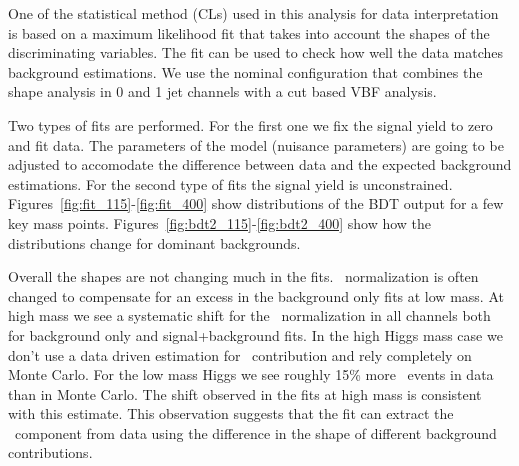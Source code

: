 One of the statistical method (CLs) used in this analysis for data
interpretation is based on a maximum likelihood fit that takes into
account the shapes of the discriminating variables. The fit can be
used to check how well the data matches background estimations. We use
the nominal configuration that combines the shape analysis in 0 and 1
jet channels with a cut based VBF analysis.

Two types of fits are performed. For the first one we fix the signal
yield to zero and fit data. The parameters of the model (nuisance
parameters) are going to be adjusted to accomodate the difference
between data and the expected background estimations. For the second
type of fits the signal yield is
unconstrained. Figures~\ref{fig:fit_115}-\ref{fig:fit_400} show
distributions of the BDT output for a few key mass
points. Figures~\ref{fig:bdt2_115}-\ref{fig:bdt2_400} show how the
distributions change for dominant backgrounds.

Overall the shapes are not changing much in the fits. \WW\
normalization is often changed to compensate for an excess in the
background only fits at low mass. At high mass we see a systematic
shift for the \WW\ normalization in all channels both for background
only and signal+background fits. In the high Higgs mass case we don't
use a data driven estimation for \WW\ contribution and rely completely
on Monte Carlo. For the low mass Higgs we see roughly 15\% more \WW\
events in data than in Monte Carlo. The shift observed in the fits at
high mass is consistent with this estimate. This observation suggests
that the fit can extract the \WW\ component from data using the
difference in the shape of different background contributions.

